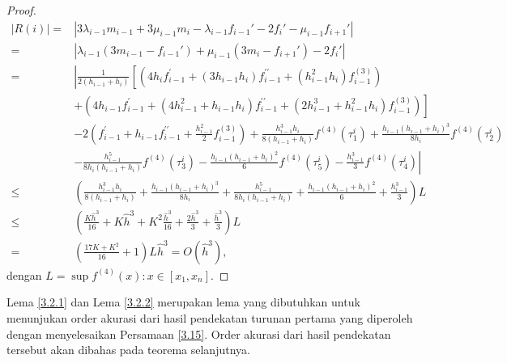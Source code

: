 \begin{proof}
\begin{align*}
        |R(i)|=&|3\lambda_{i-1}m_{i-1} + 3\mu_{i-1}m_i - \lambda_{i-1}f_{i-1}' - 2f_i' - \mu_{i-1}f_{i+1}'|\\
        =&|\lambda_{i-1}(3m_{i-1}-f_{i-1}')+\mu_{i-1}(3m_i-f_{i+1}')-2f_i'|\\
        =&\left|\frac{1}{2\left(h_{i-1}+h_{i}\right)}\left[\left(4 h_{i} f_{i-1}^{\prime}+\left(3 h_{i-1} h_{i}\right) f_{i-1}^{\prime \prime}+\left(h_{i-1}^{2} h_{i}\right) f_{i-1}^{(3)}\right)\right.\right.\\
        &+\left.\left(4 h_{i-1} f_{i-1}^{\prime}+\left(4 h_{i-1}^{2}+h_{i-1} h_{i}\right) f_{i-1}^{\prime \prime}+\left(2 h_{i-1}^{3}+h_{i-1}^{2} h_{i}\right) f_{i-1}^{(3)}\right)\right]\\
        &-2\left(f_{i-1}^{\prime}+h_{i-1} f_{i-1}^{\prime \prime}+\frac{h_{i-1}^{2}}{2} f_{i-1}^{(3)}\right)+\frac{h_{i-1}^{3} h_{i}}{8\left(h_{i-1}+h_{i}\right)} f^{(4)}\left(\tau_{1}^{i}\right)+\frac{h_{i-1}\left(h_{i-1}+h_{i}\right)^{3}}{8 h_{i}} f^{(4)}\left(\tau_{2}^{i}\right)\\
        &\left.-\frac{h_{i-1}^{5}}{8 h_{i}\left(h_{i-1}+h_{i}\right)} f^{(4)}\left(\tau_{3}^{i}\right)-\frac{h_{i-1}\left(h_{i-1}+h_{i}\right)^{2}}{6} f^{(4)}\left(\tau_{5}^{i}\right)-\frac{h_{i-1}^{3}}{3} f^{(4)}\left(\tau_{4}^{i}\right)\right|\\
        \leq&\left(\frac{h_{i-1}^{3} h_{i}}{8\left(h_{i-1}+h_{i}\right)}+\frac{h_{i-1}\left(h_{i-1}+h_{i}\right)^{3}}{8 h_{i}}+\frac{h_{i-1}^{5}}{8 h_{i}\left(h_{i-1}+h_{i}\right)}+\frac{h_{i-1}\left(h_{i-1}+h_{i}\right)^{2}}{6}+\frac{h_{i-1}^{3}}{3}\right) L \\
        \leq&\left(\frac{K \hat{h}^{3}}{16}+K \hat{h}^{3}+K^{2} \frac{\hat{h}^{3}}{16}+\frac{2 \hat{h}^{3}}{3}+\frac{\hat{h}^{3}}{3}\right) L \\
        =&\left(\frac{17 K+K^{2}}{16}+1\right)L \hat{h}^{3}=O(\hat{h}^{3}),
    \end{align*}
    dengan $L = \sup{f^{(4)}(x): x \in [x_1,x_n]}$.
\end{proof}


Lema \ref{3.2.1} dan Lema \ref{3.2.2} merupakan lema yang dibutuhkan untuk menunjukan order akurasi dari hasil pendekatan turunan pertama yang diperoleh dengan menyelesaikan Persamaan \eqref{3.15}. Order akurasi dari hasil pendekatan tersebut akan dibahas pada teorema selanjutnya.

